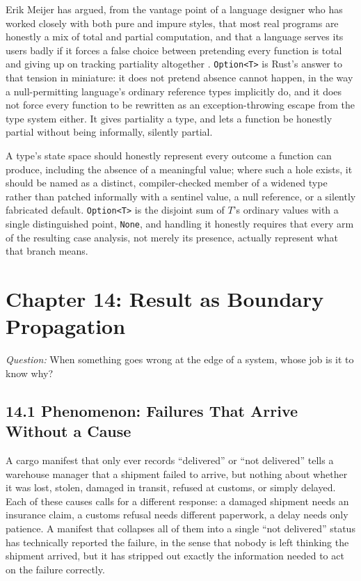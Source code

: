 \documentclass[11pt]{book}
\begin{document}
Erik Meijer has argued, from the vantage point of a language designer who has worked closely with both pure and impure styles, that most real programs are honestly a mix of total and partial computation, and that a language serves its users badly if it forces a false choice between pretending every function is total and giving up on tracking partiality altogether \cite{meijer2014}. \texttt{Option<T>} is Rust's answer to that tension in miniature: it does not pretend absence cannot happen, in the way a null-permitting language's ordinary reference types implicitly do, and it does not force every function to be rewritten as an exception-throwing escape from the type system either. It gives partiality a type, and lets a function be honestly partial without being informally, silently partial.

\begin{invariantbox}
A type's state space should honestly represent every outcome a function can produce, including the absence of a meaningful value; where such a hole exists, it should be named as a distinct, compiler-checked member of a widened type rather than patched informally with a sentinel value, a null reference, or a silently fabricated default. \texttt{Option<T>} is the disjoint sum of $T$'s ordinary values with a single distinguished point, \texttt{None}, and handling it honestly requires that every arm of the resulting case analysis, not merely its presence, actually represent what that branch means.
\end{invariantbox}

\clearpage

\chapter*{Chapter 14: Result as Boundary Propagation}

\begin{firstprinciples}
\textit{Question:} When something goes wrong at the edge of a system, whose job is it to know why?
\end{firstprinciples}

\section*{14.1 Phenomenon: Failures That Arrive Without a Cause}

A cargo manifest that only ever records ``delivered'' or ``not delivered'' tells a warehouse manager that a shipment failed to arrive, but nothing about whether it was lost, stolen, damaged in transit, refused at customs, or simply delayed. Each of these causes calls for a different response: a damaged shipment needs an insurance claim, a customs refusal needs different paperwork, a delay needs only patience. A manifest that collapses all of them into a single ``not delivered'' status has technically reported the failure, in the sense that nobody is left thinking the shipment arrived, but it has stripped out exactly the information needed to act on the failure correctly.
\end{document}
